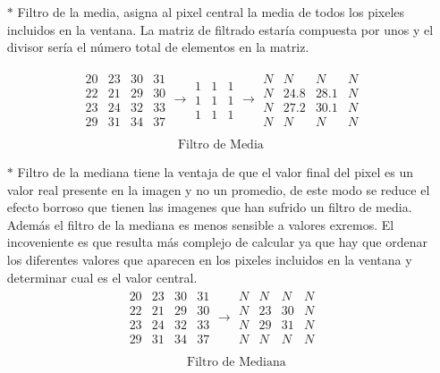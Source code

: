 \begin{itemize}
	\item[$*$] Filtro de la media, asigna al pixel central la media de todos los pixeles incluidos en la ventana. La matriz de filtrado estaría compuesta por unos y el divisor sería el número total de elementos en la matriz.
	
\begin{displaymath}
\begin{array}{l}\begin{array}{cccc}20&23&30&31\\22&21&29&30\\23&24&32&33\\29&31&34&37\end{array}\rightarrow\begin{array}{ccc}1&1&1\\1&1&1\\1&1&1\end{array}\rightarrow\begin{array}{cccc}N&N&N&N\\N&24.8&28.1&N\\N&27.2&30.1&N\\N&N&N&N\end{array}\\\\\;\;\;\;\;\;\;\;\;\;\;\;\;\;\;\;\;\;\;\;\;\;\;\;\;\;\;\;\text{Filtro de Media}\end{array}
\end{displaymath}
				
	\item[$*$] Filtro de la mediana tiene la ventaja de que el valor final del pixel es un valor real presente en la imagen y no un promedio, de este modo se reduce el efecto borroso que tienen las imagenes que han sufrido un filtro de media. Además el filtro de la mediana es menos sensible a valores exremos. El incoveniente es que resulta más complejo de calcular ya que hay que ordenar los diferentes valores que aparecen en los pixeles incluidos en la ventana y determinar cual es el valor central.
\begin{displaymath}
\begin{array}{l}\begin{array}{cccc}20&23&30&31\\22&21&29&30\\23&24&32&33\\29&31&34&37\end{array}\rightarrow\begin{array}{cccc}N&N&N&N\\N&23&30&N\\N&29&31&N\\N&N&N&N\end{array}\\\\\;\;\;\;\;\;\;\;\;\;\;\;\;\;\;\;\;\;\text{Filtro de Mediana}\end{array}
\end{displaymath}


\end{itemize}
